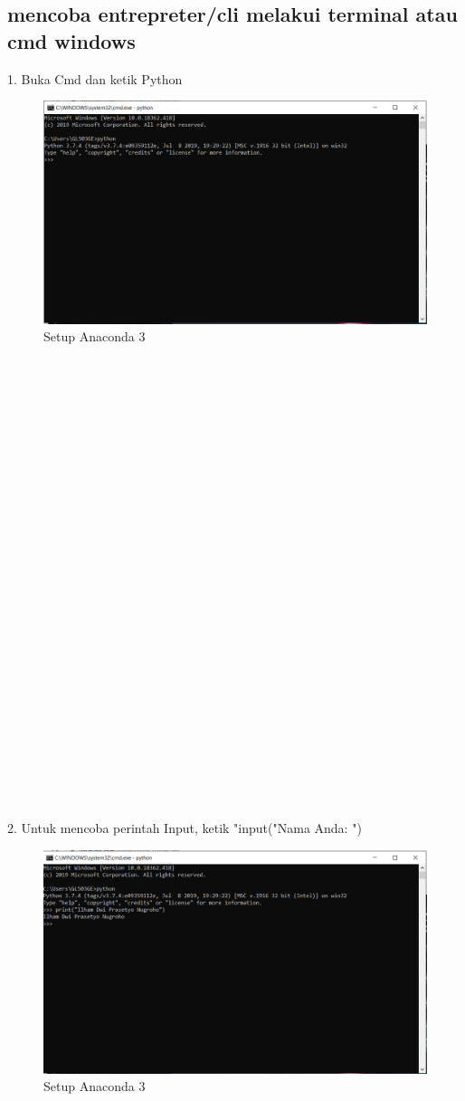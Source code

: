\documentclass{article}
\begin{document}
\subsection{mencoba entrepreter/cli melakui terminal atau cmd windows}
1. Buka Cmd dan ketik Python
\begin{figure}[h]
	\centering
		\includegraphics[scale=0.5]{Gambar/C1.PNG}
		\caption{Setup Anaconda 3}
\end{figure}
\\
\\
\\
\\
\\
\\
\\
\\
\\
\\
\\
\\
\\
\\
\\
\\
\\
\\
\\
\\
\\
\\
\\
\\
\\
\\
2. Untuk mencoba perintah Input, ketik "input("Nama Anda: ")
\begin{figure}[h]
	\centering
		\includegraphics[scale=0.5]{Gambar/C2.PNG}
		\caption{Setup Anaconda 3}
\end{figure}
\end{document}
